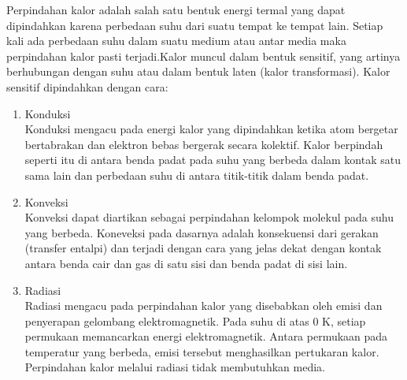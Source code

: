 
Perpindahan kalor adalah salah satu bentuk energi termal yang dapat dipindahkan karena perbedaan suhu dari suatu tempat ke tempat lain\cite{HeatTransferIncropera}. Setiap kali ada perbedaan suhu dalam suatu medium atau antar media maka perpindahan kalor pasti terjadi.Kalor muncul dalam bentuk sensitif, yang artinya berhubungan dengan suhu atau dalam bentuk laten (kalor transformasi). Kalor sensitif dipindahkan dengan cara:\cite{BuildingPhysics}

\begin{enumerate}
	\item Konduksi \\
	Konduksi mengacu pada energi kalor yang dipindahkan ketika atom bergetar bertabrakan dan elektron bebas bergerak secara kolektif. Kalor berpindah seperti itu di antara benda padat pada suhu yang berbeda dalam kontak satu sama lain dan perbedaan suhu di antara titik-titik dalam benda padat.
	\item Konveksi \\
	Konveksi dapat diartikan sebagai perpindahan kelompok molekul pada suhu yang berbeda. Koneveksi pada dasarnya adalah konsekuensi dari gerakan (transfer entalpi) dan terjadi dengan cara yang jelas dekat dengan kontak antara benda cair dan gas di satu sisi dan benda padat di sisi lain.
	\item Radiasi \\
	Radiasi mengacu pada perpindahan kalor yang disebabkan oleh emisi dan penyerapan gelombang elektromagnetik. Pada suhu di atas 0 K, setiap permukaan memancarkan energi elektromagnetik. Antara permukaan pada temperatur yang berbeda, emisi tersebut menghasilkan pertukaran kalor. Perpindahan kalor melalui radiasi tidak membutuhkan media.
\end{enumerate}

